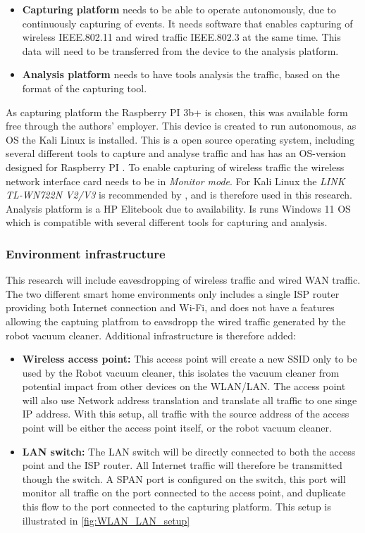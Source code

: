 \begin{itemize}
    \item \textbf{Capturing platform} needs to be able to operate autonomously, due to continuously capturing of events. It needs software that enables capturing of wireless IEEE.802.11 and wired traffic IEEE.802.3 at the same time. This data will need to be transferred from the device to the analysis platform.
    \item \textbf{Analysis platform} needs to have tools analysis the traffic, based on the format of the capturing tool. 
\end{itemize}

As capturing platform the Raspberry PI 3b+ is chosen, this was available form free through the authors' employer. This device is created to run autonomous, as OS the Kali Linux is installed. This is a open source operating system, including several different tools to capture and analyse traffic and has has an OS-version designed for Raspberry PI \cite{kalidownload}. To enable capturing of wireless traffic the wireless network interface card needs to be in \textit{Monitor mode}. For Kali Linux the \textit{LINK TL-WN722N V2/V3} is recommended by \cite{Kali_monitormode_guide}, and is therefore used in this research. 
Analysis platform is a HP Elitebook due to availability. Is runs Windows 11 OS which is compatible with several different tools for capturing and analysis.

\subsubsection{Environment infrastructure}
This research will include eavesdropping of wireless traffic and wired WAN traffic. The two different smart home environments only includes a single ISP router providing both Internet connection and Wi-Fi, and does not have a features allowing the captuing platfrom to eavsdropp the wired traffic generated by the robot vacuum cleaner. Additional infrastructure is therefore added: 
\begin{itemize}
    \item \textbf{Wireless access point:} This access point will create a new SSID only to be used by the Robot vacuum cleaner, this isolates the vacuum cleaner from potential impact from other devices on the WLAN/LAN. The access point will also use Network address translation and translate all traffic to one singe IP address. With this setup, all traffic with the source address of the access point will be either the access point itself, or the robot vacuum cleaner.
    \item \textbf{LAN switch:} The LAN switch will be directly connected to both the access point and the ISP router. All Internet traffic will therefore be transmitted though the switch. A SPAN port is configured on the switch, this port will monitor all traffic on the port connected to the access point, and duplicate this flow to the port connected to the capturing platform. This setup is illustrated in \ref{fig:WLAN_LAN_setup}
\end{itemize}

